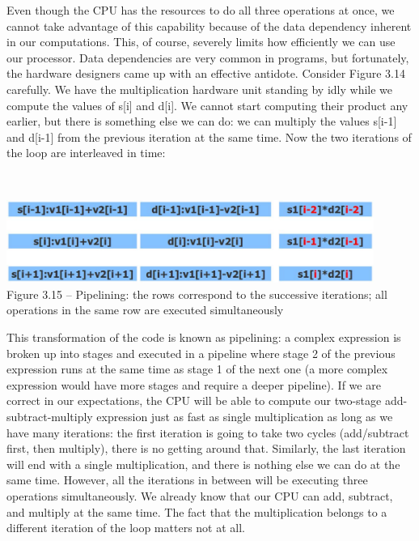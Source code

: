 Even though the CPU has the resources to do all three operations at once, we cannot take advantage of this capability because of the data dependency inherent in our computations. This, of course, severely limits how efficiently we can use our processor. Data dependencies are very common in programs, but fortunately, the hardware designers came up with an effective antidote. Consider Figure 3.14 carefully. We have the multiplication hardware unit standing by idly while we compute the values of s[i] and d[i]. We cannot start computing their product any earlier, but there is something else we can do: we can multiply the values s[i-1] and d[i-1] from the previous iteration at the same time. Now the two iterations of the loop are interleaved in time:

\hspace*{\fill} \\ %
\begin{center}
\includegraphics[width=0.9\textwidth]{content/1/chapter3/images/15.jpg}\\
Figure 3.15 – Pipelining: the rows correspond to the successive iterations; all operations in the same row are executed simultaneously
\end{center}

This transformation of the code is known as pipelining: a complex expression is broken up into stages and executed in a pipeline where stage 2 of the previous expression runs at the same time as stage 1 of the next one (a more complex expression would have more stages and require a deeper pipeline). If we are correct in our expectations, the CPU will be able to compute our two-stage add-subtract-multiply expression just as fast as single multiplication as long as we have many iterations: the first iteration is going to take two cycles (add/subtract first, then multiply), there is no getting around that. Similarly, the last iteration will end with a single multiplication, and there is nothing else we can do at the same time. However, all the iterations in between will be executing three operations simultaneously. We already know that our CPU can add, subtract, and multiply at the same time. The fact that the multiplication belongs to a different iteration of the loop matters not at all.

